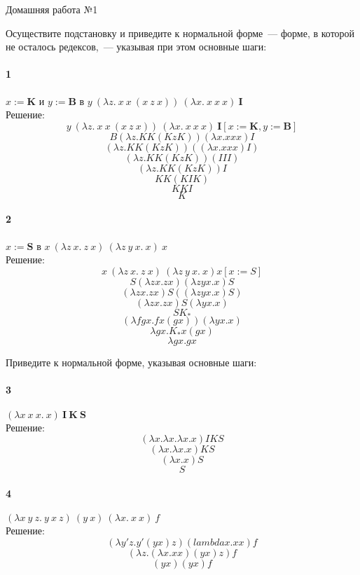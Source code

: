 \documentclass[12pt, a4paper] {article}
\begin{document}
\frenchspacing
\pagestyle{empty}

\begin{center}
Домашняя работа №1
\end{center}

Осуществите подстановку и приведите к нормальной форме~--- форме, в которой не
осталось редексов,~--- указывая при этом основные шаги:

\paragraph{1} $x := \mathbf{K}$ и $y := \mathbf{B}$ в
    $y~(\lambda z.~x~x~(x~z~x))~(\lambda x.~x~x~x)~\mathbf{I}$\\
Решение:
    		$$y~(\lambda z.~x~x~(x~z~x))~(\lambda x.~x~x~x)~\mathbf{I} [x := \mathbf{K}, y := \mathbf{B}]$$
		$$B(\lambda z. KK(KzK))(\lambda x.xxx)I $$
        $$ (\lambda z.KK(KzK))((\lambda x.xxx)I)$$
        $$ (\lambda z.KK(KzK))(III) $$
        $$ (\lambda z.KK(KzK))I $$
        $$ KK(KIK) $$
        $$ KKI $$
        $$ K $$
\paragraph{2}$x := \mathbf{S}$ в
    $x~(\lambda z~x.~z~x)~(\lambda z~y~x.~x)~x$ \\
Решение:
   $$x~(\lambda z~x.~z~x)~(\lambda z~y~x.~x)x [x := S]$$
   $$ S(\lambda zx.zx)(\lambda zyx.x)S $$
   $$ (\lambda zx.zx) S ((\lambda zyx.x) S) $$
   $$ (\lambda zx.zx) S (\lambda yx.x)  $$
   $$ S K_* $$
   $$ (\lambda fgx. f x (g x))(\lambda yx.x) $$
   $$ \lambda gx. K_* x (g x) $$
   $$ \lambda gx. gx $$
   

Приведите к нормальной форме, указывая основные шаги:

\paragraph{3}$(\lambda x~x~x .~x)~\mathbf{I}~\mathbf{K}~\mathbf{S}$ \\
Решение:
	$$ (\lambda x.\lambda x. \lambda x.x) I K S $$
	$$ (\lambda x. \lambda x.x) K S $$
	$$ (\lambda x. x) S $$
	$$ S $$

\paragraph{4} $(\lambda x~y~z .~y~x~z)~(y~x)~(\lambda x .~x~x)~f$ \\
Решение:
	$$ (\lambda y' z. y' (yx) z)(lambda x. x x) f $$
	$$ (\lambda z. (\lambda x. xx) (y x) z) f $$
	$$ (y x) (y x) f $$
\end{document}
